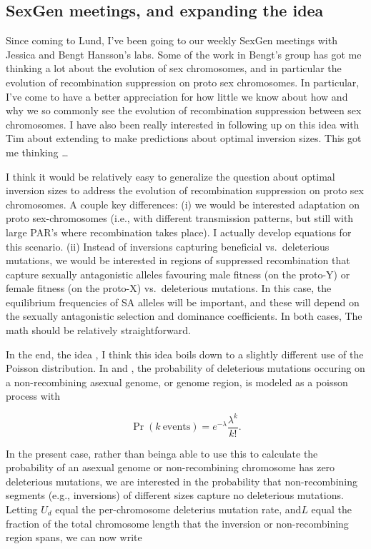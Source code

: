 \documentclass[11pt]{article}
\begin{document}
\subsection{SexGen meetings, and expanding the idea}
		
	Since coming to Lund, I've been going to our weekly SexGen meetings with Jessica and Bengt Hansson's labs. Some of the work in Bengt's group has got me thinking a lot about the evolution of sex chromosomes, and in particular the evolution of recombination suppression on proto sex chromosomes. In particular, I've come to have a better appreciation for how little we know about how and why we so commonly see the evolution of recombination suppression between sex chromosomes. I have also been really interested in following up on this idea with Tim about extending \citet{Orr2000} to make predictions about optimal inversion sizes. This got me thinking \ldots
	\bigskip

	I think it would be relatively easy to generalize the question about optimal inversion sizes to address the evolution of recombination suppression on proto sex chromosomes. A couple key differences: (i) we would be interested adaptation on proto sex-chromosomes (i.e., with different transmission patterns, but still with large PAR's where recombination takes place). I\citet{OrrKim1998} actually develop equations for this scenario. (ii) Instead of inversions capturing beneficial vs.~deleterious mutations, we would be interested in regions of suppressed recombination that capture sexually antagonistic alleles favouring male fitness (on the proto-Y) or female fitness (on the proto-X) vs.~deleterious mutations. In this case, the equilibrium frequencies of SA alleles will be important, and these will depend on the sexually antagonistic selection and dominance coefficients. In both cases, The math should be relatively straightforward.
	\bigskip

	In the end, the idea , I think this idea boils down to a slightly different use of the Poisson distribution. In \citet{Orr2000} and \citet{OrrKim1998}, the probability of deleterious mutations occuring on a non-recombining asexual genome, or genome region, is modeled as a poisson process with 

\begin{equation*}
	\Pr(k~\text{events}) = e^{-\lambda} \frac{\lambda^{k}}{k!}.
\end{equation*}

	\noindent In the present case, rather than beinga able to use this to calculate the probability of an asexual genome or non-recombining chromosome has zero deleterious mutations, we are interested in the probability that non-recombining segments (e.g., inversions) of different sizes capture no deleterious mutations. Letting $U_d$ equal the per-chromosome deleterius  mutation rate, and$L$ equal the fraction of the total chromosome length that the inversion or non-recombining region spans, we can now write  
\end{document}
